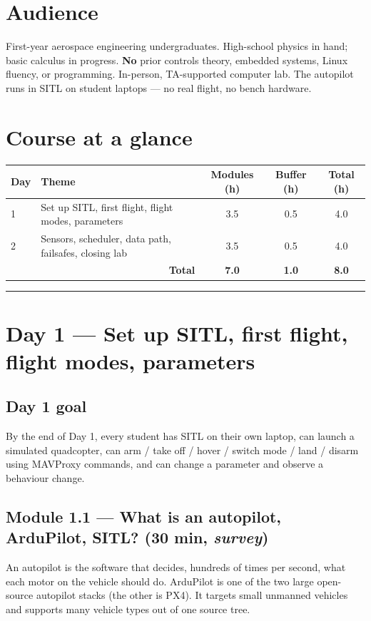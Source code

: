 \documentclass[a4paper,11pt,twoside]{article}
\begin{document}
\section*{Audience}
First-year aerospace engineering undergraduates. High-school physics in hand; basic calculus in progress. \textbf{No} prior controls theory, embedded systems, Linux fluency, or programming. In-person, TA-supported computer lab. The autopilot runs in SITL on student laptops --- no real flight, no bench hardware.

\section*{Course at a glance}
\begin{center}\small
\begin{tabular}{|l|l|c|c|c|}\hline
Day & Theme & Modules (h) & Buffer (h) & Total (h) \\ \hline
1 & Set up SITL, first flight, flight modes, parameters & 3.5 & 0.5 & 4.0 \\ \hline
2 & Sensors, scheduler, data path, failsafes, closing lab & 3.5 & 0.5 & 4.0 \\ \hline
\multicolumn{2}{|r|}{\textbf{Total}} & \textbf{7.0} & \textbf{1.0} & \textbf{8.0} \\ \hline
\end{tabular}
\end{center}

\hrule\bigskip
\section{Day 1 --- Set up SITL, first flight, flight modes, parameters}

\subsection*{Day 1 goal}
By the end of Day 1, every student has SITL on their own laptop, can launch a simulated quadcopter, can arm / take off / hover / switch mode / land / disarm using MAVProxy commands, and can change a parameter and observe a behaviour change.

\subsection{Module 1.1 --- What is an autopilot, ArduPilot, SITL? (30 min, \emph{survey})}

An autopilot is the software that decides, hundreds of times per second, what each motor on the vehicle should do. ArduPilot is one of the two large open-source autopilot stacks (the other is PX4). It targets small unmanned vehicles and supports many vehicle types out of one source tree.
\end{document}
